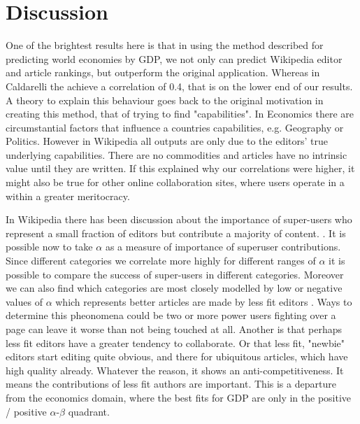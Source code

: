 
\section{Discussion}

One of the brightest results here is that in using the method described for predicting world economies by GDP, we not only can predict Wikipedia editor and article rankings, but outperform the original application. Whereas in Caldarelli the achieve a correlation of 0.4, \cite{Caldarelli} that is on the lower end of our results. A theory to explain this behaviour goes back to the original motivation in creating this method, that of trying to find "capabilities". In Economics there are circumstantial factors that influence a countries capabilities, e.g. Geography or Politics. However in Wikipedia all outputs are only due to the editors' true underlying capabilities. There are no commodities and articles have no intrinsic value until they are written. If this explained why our correlations were higher, it might also be true for other online collaboration sites, where users operate in a within a greater meritocracy.

In Wikipedia there has been discussion about the importance of super-users who represent a small fraction of editors but contribute a majority of content. \cite{website:wikinewsreporter}. It is possible now to take $\alpha$ as a measure of importance of superuser contributions. Since different categories we correlate more highly for different ranges of $\alpha$ it is possible to compare the success of super-users in different categories. Moreover we can also find which categories are most closely modelled by low or negative values of $\alpha$ which represents better articles are made by less fit editors . Ways to determine this pheonomena could be two or more power users fighting over a page can leave it worse than not being touched at all. Another is that perhaps less fit editors have a greater tendency to collaborate. Or that less fit, "newbie" editors start editing quite obvious, and there for ubiquitous articles, which have high quality already.  Whatever the reason,  it shows an anti-competitiveness. It means the contributions of less fit authors are important. This is a departure from the economics domain, where the best fits for GDP are only in the positive / positive $\alpha$-$\beta$ quadrant. 
